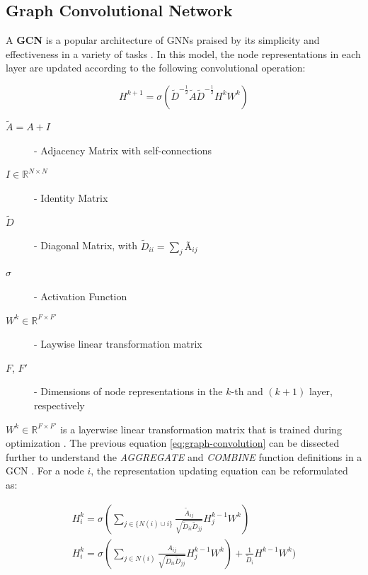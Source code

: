 \subsection{Graph Convolutional Network}

A \textbf{\acf{GCN}} \cite{kipfSemiSupervisedClassificationGraph2017} is a popular architecture of \acp{GNN} praised by its simplicity and effectiveness in a variety of tasks \cite{liuIntroductionGraphNeural2020, tangGraphNeuralNetworks2022}. In this model, the node representations in each layer are updated according to the following convolutional operation:

\begin{equation} \label{eq:graph-convolution}
	H^{k+1} = \sigma(\tilde{D}^{-\frac{1}{2}} \tilde{A} \tilde{D}^{-\frac{1}{2}} H^k W^k)  
\end{equation}

\begin{description}
	\item[$\tilde{A} = A + I$] - Adjacency Matrix with self-connections 
	\item[$I \in \mathbb{R}^{N \times N}$] - Identity Matrix 
	\item[$\tilde{D}$] - Diagonal Matrix,  with $\tilde{D}_{ii} = \sum_j Ã_{ij}$ 
	\item[$\sigma$] - Activation Function 
	\item[$W^k \in \mathbb{R}^{F \times F'}$] - Laywise linear transformation matrix 
	\item[$F$, $F'$] - Dimensions of node representations in the $k$-th and $(k + 1)$ layer, respectively
\end{description}


$W^k \in \mathbb{R}^{F \times F'}$ is a layerwise linear transformation matrix that is trained during optimization \cite{tangGraphNeuralNetworks2022}. The previous equation \ref{eq:graph-convolution} can be dissected further to understand the \textit{AGGREGATE} and \textit{COMBINE} function definitions in a \ac{GCN} \cite{tangGraphNeuralNetworks2022}. For a node $i$, the representation updating equation can be reformulated as:

\begin{gather}
	H^k_i = \sigma(\sum_{j \in \{N(i) \cup i\}} \frac{\tilde{A}_{ij}}{\sqrt{\tilde{D}_{ii} \tilde{D}_{jj}}} H^{k-1}_j W^k) \\
	H^k_i = \sigma(\sum_{j \in N(i)} \frac{A_{ij}}{\sqrt{\tilde{D}_{ii} \tilde{D}_{jj}}} H^{k-1}_j W^k) + \frac{1}{\tilde{D}_i} H^{k-1} W^k)
\end{gather}

